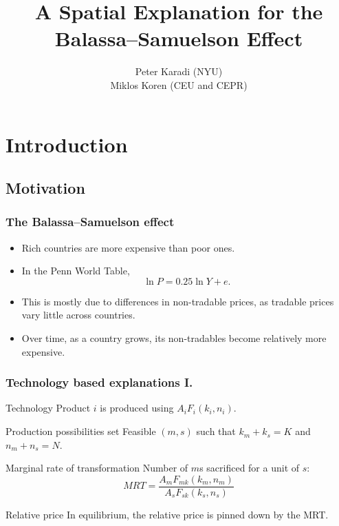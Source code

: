 \documentclass[compress,mathserif]{beamer}
\title[Balassa--Samuelson]%
{A Spatial Explanation for the\\ Balassa--Samuelson Effect}
\author[Karadi and Koren] %
{Peter Karadi (NYU)\\
Miklos Koren (CEU and CEPR)}
\date %
{}
\newcounter{perc}
\newcounter{percek}
\renewcommand{\time}[1]{\addtocounter{percek}{#1}}
\begin{document}
\begin{frame}[plain]
  \titlepage
    \addtocounter{framenumber}{-1}
\end{frame}


\section{Introduction}

\subsection{Motivation}
\begin{frame}\frametitle{The Balassa--Samuelson effect}

\begin{itemize}
    \item<1-> Rich countries are more expensive than poor ones.
    \item<1-> In the Penn World Table,
    \[
    \ln P = 0.25\ln Y + e.
    \]
    \item<2-> This is mostly due to differences in non-tradable prices, as tradable prices vary little across countries.
        \hyperlink{shampoo}{}
    \item<3-> Over time, as a country grows, its non-tradables become relatively more expensive.         \hyperlink{US_VA_prices}{}

\end{itemize}
\end{frame}

\time{2}

\begin{frame}\frametitle{Technology based explanations I.}

\begin{block}{Technology}
Product $i$ is produced using $A_iF_i(k_i,n_i)$.
\end{block}

\begin{block}{Production possibilities set}
Feasible $(m,s)$ such that $k_m+k_s = K$ and $n_m+n_s = N$.
\end{block}

\begin{block}{Marginal rate of transformation}
Number of $m$s sacrificed for a unit of $s$:
\[
MRT=\frac{A_mF_{mk}(k_m,n_m)}{A_sF_{sk}(k_s,n_s)}
\]
\end{block}

\begin{block}{Relative price}
In equilibrium, the relative price is pinned down by the MRT.
\end{block}

\end{frame}
\end{document}
